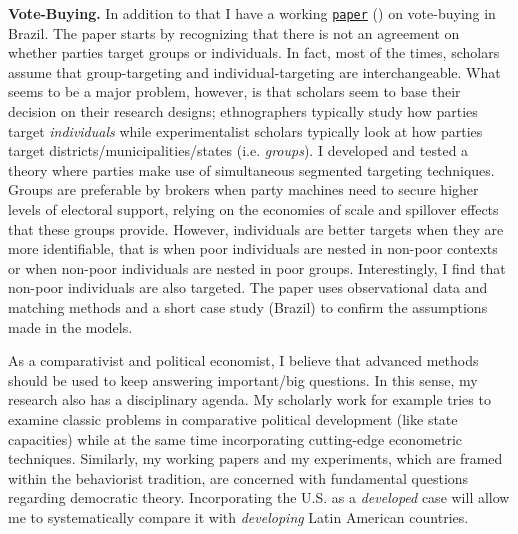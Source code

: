 \documentclass[10pt,stdletter,dateno,sigleft]{newlfm} %
\begin{document}
\begin{newlfm}
{\bf Vote-Buying.} In addition to that I have a working \href{https://github.com/hbahamonde/Clientelism_paper/raw/master/Bahamonde_Clientelism_Paper.pdf}{\texttt{paper}} (\emph{\unskip}) on vote-buying in Brazil. The paper starts by recognizing that there is not an agreement on whether parties target groups or individuals. In fact, most of the times, scholars assume that group-targeting and individual-targeting are interchangeable. What seems to be a major problem, however, is that scholars seem to base their decision on their research designs; ethnographers typically study how parties target \emph{individuals} while experimentalist scholars typically look at how parties target districts/municipalities/states (i.e. \emph{groups}). I developed and tested a theory where parties make use of simultaneous segmented targeting techniques. Groups are preferable by brokers when party machines need to secure higher levels of electoral support, relying on the economies of scale and spillover effects that these groups provide. However, individuals are better targets when they are more identifiable, that is when poor individuals are nested in non-poor contexts or when non-poor individuals are nested in poor groups. Interestingly, I find that non-poor individuals are also targeted. The paper uses observational data and matching methods and a short case study (Brazil) to confirm the assumptions made in the models.

As a comparativist and political economist, I believe that advanced methods should be used to keep answering important/big questions. In this sense, my research also has a disciplinary agenda. My scholarly work for example tries to examine classic problems in comparative political development (like state capacities) while at the same time incorporating cutting-edge econometric techniques. Similarly, my working papers and my experiments, which are framed within the behaviorist tradition, are concerned with fundamental questions regarding democratic theory. Incorporating the U.S. as a \emph{developed} case will allow me to systematically compare it with \emph{developing} Latin American countries.


\end{newlfm}
\end{document}
